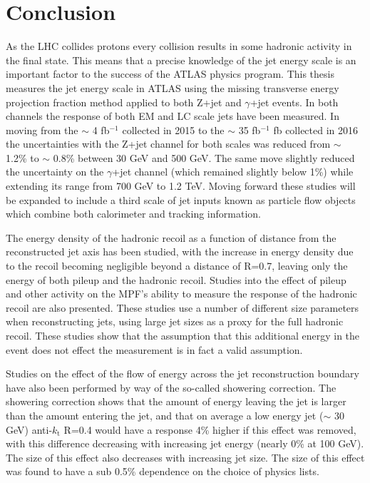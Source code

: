 \chapter{Conclusion}

As the LHC collides protons every collision results in some hadronic activity in the final state.  
This means that a precise knowledge of the jet energy scale is an important factor to the success of the ATLAS physics program.  
This thesis measures the jet energy scale in ATLAS using the missing transverse energy projection fraction method applied to both Z+jet and $\gamma$+jet events.  
In both channels the response of both EM and LC scale jets have been measured.  
In moving from the $\sim$ 4 fb$^{-1}$ collected in 2015 to the $\sim$ 35 fb$^{-1}$ fb collected in 2016 the uncertainties with the Z+jet channel for both scales was reduced from $\sim$ 1.2\% to $\sim$ 0.8\% between 30 GeV and 500 GeV.   
The same move slightly reduced the uncertainty on the $\gamma$+jet channel (which remained slightly below 1\%) while extending its range from 700 GeV to 1.2 TeV.  
Moving forward these studies will be expanded to include a third scale of jet inputs known as particle flow objects which combine both calorimeter and tracking information.  

The energy density of the hadronic recoil as a function of distance from the reconstructed jet axis has been studied, with the increase in energy density due to the recoil becoming negligible beyond a distance of R=0.7, leaving only the energy of both pileup and the hadronic recoil.  
Studies into the effect of pileup and other activity on the MPF's ability to measure the response of the hadronic recoil are also presented.  
These studies use a number of different size parameters when reconstructing jets, using large jet sizes as a proxy for the full hadronic recoil.  
These studies show that the assumption that this additional energy in the event does not effect the measurement is in fact a valid assumption.  


Studies on the effect of the flow of energy across the jet reconstruction boundary have also been performed by way of the so-called showering correction.  
The showering correction shows that the amount of energy leaving the jet is larger than the amount entering the jet, and that on average a low energy jet ($\sim$ 30 GeV) anti-$k_\mathrm{t}$ R=0.4 would have a response 4\% higher if this effect was removed, with this difference decreasing with increasing jet energy (nearly 0\% at 100 GeV).  
The size of this effect also decreases with increasing jet size.  
The size of this effect was found to have a sub 0.5\% dependence on the choice of physics lists.  

